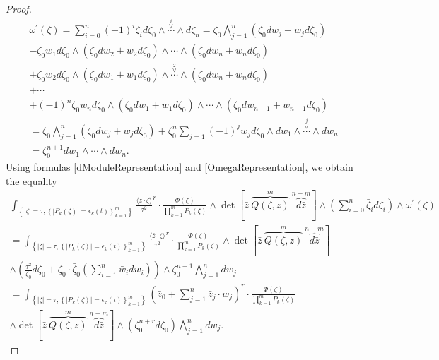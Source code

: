 \documentclass[11pt,reqno]{amsart}
\numberwithin{equation}{section}
\begin{document}
\begin{proof}
\begin{multline}
\omega^{\prime}(\zeta)=\sum_{i=0}^n(-1)^{i}\zeta_id\zeta_0\wedge\stackrel{\stackrel{i}{\vee}}
{\cdots}\wedge d\zeta_n=\zeta_0\bigwedge_{j=1}^n\left(\zeta_0dw_j+w_jd\zeta_0\right)\\
-\zeta_0w_1d\zeta_0\wedge\left(\zeta_0dw_2+w_2d\zeta_0\right)\wedge\cdots
\wedge\left(\zeta_0dw_n+w_nd\zeta_0\right)\\
+\zeta_0w_2d\zeta_0\wedge\left(\zeta_0dw_1+w_1d\zeta_0\right)\wedge
\stackrel{\stackrel{2}{\vee}}{\cdots}
\wedge\left(\zeta_0dw_n+w_nd\zeta_0\right)\\
+\cdots\\
+(-1)^n\zeta_0w_nd\zeta_0\wedge\left(\zeta_0dw_1+w_1d\zeta_0\right)\wedge\cdots
\wedge\left(\zeta_0dw_{n-1}+w_{n-1}d\zeta_0\right)\\
=\zeta_0\bigwedge_{j=1}^n\left(\zeta_0dw_j+w_jd\zeta_0\right)
+\zeta_0^n\sum_{j=1}(-1)^jw_jd\zeta_0\wedge dw_1
\wedge\stackrel{\stackrel{j}{\vee}}{\cdots}\wedge dw_n\\
=\zeta_0^{n+1}dw_1\wedge\cdots\wedge dw_n.
\end{multline}
\indent
Using formulas \eqref{dModuleRepresentation} and \eqref{OmegaRepresentation},
we obtain the equality
\begin{multline*}
\int_{\left\{|\zeta|=\tau,\left\{|P_k(\zeta)|=\epsilon_k(t)\right\}_{k=1}^m\right\}}
\frac{\langle{\bar z}\cdot\zeta\rangle}{\tau^2}^r\cdot\frac{\Phi(\zeta)}{\prod_{k=1}^mP_k(\zeta)}
\wedge\det\left[{\bar z}\ \overbrace{Q(\zeta,z)}^{m}\ \overbrace{d{\bar z}}^{n-m}\right]
\wedge\left(\sum_{i=0}^n{\bar\zeta}_id\zeta_i\right)\wedge\omega^{\prime}(\zeta)\\
=\int_{\left\{|\zeta|=\tau,\left\{|P_k(\zeta)|=\epsilon_k(t)\right\}_{k=1}^m\right\}}
\frac{\langle{\bar z}\cdot\zeta\rangle}{\tau^2}^r\cdot\frac{\Phi(\zeta)}{\prod_{k=1}^mP_k(\zeta)}
\wedge\det\left[{\bar z}\ \overbrace{Q(\zeta,z)}^{m}\ \overbrace{d{\bar z}}^{n-m}\right]\\
\wedge\left(\frac{\tau^2}{\zeta_0}d\zeta_0
+\zeta_0\cdot {\bar\zeta}_0\left(\sum_{i=1}^n{\bar w}_idw_i\right)\right)
\wedge\zeta_0^{n+1}\bigwedge_{j=1}^n dw_j\\
=\int_{\left\{|\zeta|=\tau,\left\{|P_k(\zeta)|=\epsilon_k(t)\right\}_{k=1}^m\right\}}
\left({\bar z}_0+\sum_{j=1}^n{\bar z}_j\cdot w_j\right)^r\cdot
\frac{\Phi(\zeta)}{\prod_{k=1}^mP_k(\zeta)}\\
\wedge\det\left[{\bar z}\ \overbrace{Q(\zeta,z)}^{m}\ \overbrace{d{\bar z}}^{n-m}\right]
\wedge \left(\zeta_0^{n+r}d\zeta_0\right)\bigwedge_{j=1}^n dw_j.
\end{multline*}

\end{proof}
\end{document}
